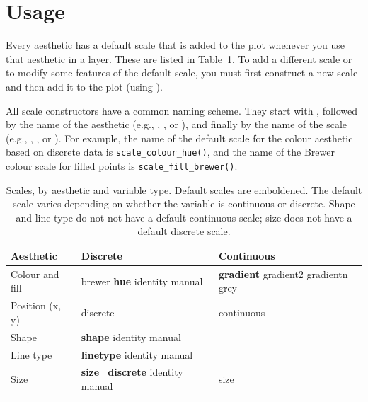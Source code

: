 \section{Usage}
\label{sec:scale-usage}

Every aesthetic has a default scale that is added to the plot whenever you use that aesthetic in a layer.  These are listed in Table~\ref{tbl:default-scales}.   To add a different scale or to modify some features of the default scale, you must first construct a new scale and then add it to the plot (using \code{+}). 

All scale constructors have a common naming scheme.  They start with , followed by the name of the aesthetic (e.g., , , or ), and finally by the name of the scale (e.g., , , or ). For example, the name of the default scale for the colour aesthetic based on discrete data is {\tt scale\_colour\_hue()}, and the name of the Brewer colour scale for filled points is {\tt scale\_fill\_brewer()}.

\begin{table}
  \begin{center}
  \begin{tabular}{p{1in}p{1in}p{1in}}
    \toprule
    Aesthetic & Discrete & Continuous \\
    \midrule
    Colour and fill & brewer \newline \textbf{hue} \newline identity \newline manual & \textbf{gradient} \newline gradient2 \newline gradientn \newline grey \\[0.5em]
    Position (x, y) & discrete & continuous \\[0.5em]
    Shape & \textbf{shape} \newline identity \newline manual &  \\[0.5em]
    Line type & \textbf{linetype} \newline identity \newline manual &  \\[0.5em]
    Size & \textbf{size\_discrete} \newline identity \newline manual & size \\
    \bottomrule
  \end{tabular}
  \end{center}
  \caption{Scales, by aesthetic and variable type.  Default scales are emboldened. The default scale varies depending on whether the variable is continuous or discrete.  Shape and line type do not not have a default continuous scale; size does not have a default discrete scale.}
  \label{tbl:default-scales}
\end{table}

